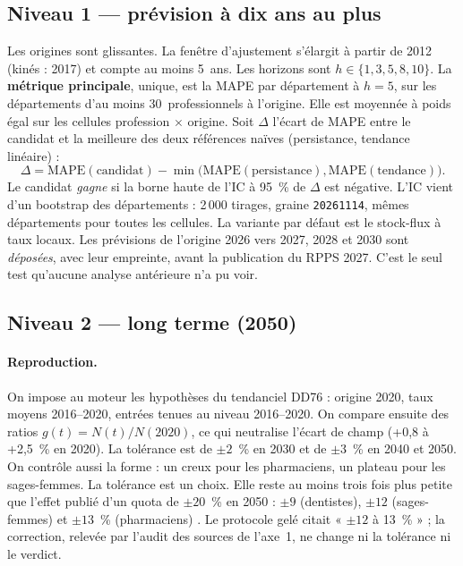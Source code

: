 \subsection{Niveau 1 --- prévision à dix ans au plus}
Les origines sont glissantes. La fenêtre d'ajustement s'élargit à partir de 2012 (kinés : 2017) et
compte au moins 5\suppose{}~ans. Les horizons sont $h \in \{1, 3, 5, 8, 10\}$. La \textbf{métrique
principale}, unique, est la MAPE par département à $h = 5$, sur les départements d'au moins
30\suppose{}~professionnels à l'origine. Elle est moyennée à poids égal sur les cellules
profession $\times$ origine. Soit $\Delta$ l'écart de MAPE entre le candidat et la meilleure des deux
références naïves (persistance, tendance linéaire) :
\[
  \Delta = \mathrm{MAPE}(\text{candidat}) - \min\bigl(\mathrm{MAPE}(\text{persistance}),
  \mathrm{MAPE}(\text{tendance})\bigr).
\]
Le candidat \emph{gagne} si la borne haute de l'IC à 95~\% de $\Delta$ est négative. L'IC vient d'un
bootstrap des départements : 2\,000 tirages, graine \texttt{20261114}, mêmes départements pour
toutes les cellules. La variante par défaut est le stock-flux à taux locaux. Les prévisions de
l'origine 2026 vers 2027, 2028 et 2030 sont \emph{déposées}, avec leur empreinte, avant la
publication du RPPS 2027. C'est le seul test qu'aucune analyse antérieure n'a pu voir.

\subsection{Niveau 2 --- long terme (2050)}
\paragraph{Reproduction.} On impose au moteur les hypothèses du tendanciel DD76 : origine 2020, taux
moyens 2016--2020, entrées tenues au niveau 2016--2020. On compare ensuite des ratios
$g(t) = N(t)/N(2020)$, ce qui neutralise l'écart de champ (+0,8 à +2,5\mesure{}~\% en 2020). La
tolérance est de $\pm 2$\suppose{}~\% en 2030 et de $\pm 3$\suppose{}~\% en 2040 et 2050. On
contrôle aussi la forme : un creux pour les pharmaciens, un plateau pour les sages-femmes. La
tolérance est un choix. Elle reste au moins trois fois plus petite que l'effet publié d'un quota
de $\pm 20$~\% en 2050 : $\pm 9$ (dentistes), $\pm 12$ (sages-femmes) et $\pm 13$\mesure{}~\%
(pharmaciens) \citep[p.~3 et 58--59]{a3-drees2021dd76}. Le protocole gelé citait « $\pm 12$ à 13~\% » ;
la correction, relevée par l'audit des sources de l'axe~1, ne change ni la tolérance ni le verdict.

